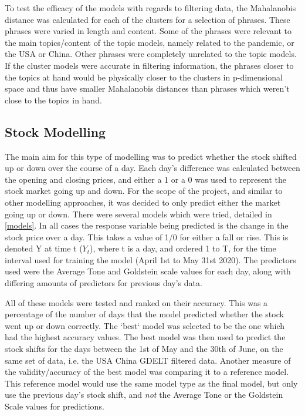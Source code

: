 To test the efficacy of the models with regards to filtering data, the Mahalanobis distance was calculated for each of the clusters for a selection of phrases. These phrases were varied in length and content. Some of the phrases were relevant to the main topics/content of the topic models, namely related to the pandemic, or the USA or China. Other phrases were completely unrelated to the topic models. If the cluster models were accurate in filtering information, the phrases closer to the topics at hand would be physically closer to the clusters in p-dimensional space and thus have smaller Mahalanobis distances than phrases which weren't close to the topics in hand.  

\subsection{Stock Modelling}
The main aim for this type of modelling was to predict whether the stock shifted up or down over the course of a day. Each day's difference was calculated between the opening and closing prices, and either a 1 or a 0 was used to represent the stock market going up and down. For the scope of the project, and similar to other modelling approaches, it was decided to only predict either the market going up or down. There were several models which were tried, detailed in \ref{models}. In all cases the response variable being predicted is the change in the stock price over a day. This takes a value of 1/0 for either a fall or rise. This is denoted Y at time t ($Y_{t}$), where t is a day, and ordered 1 to T, for the time interval used for training the model (April 1st to May 31st 2020). The predictors used were the Average Tone and Goldstein scale values for each day, along with differing amounts of predictors for previous day's data.

All of these models were tested and ranked on their accuracy. This was a percentage of the number of days that the model predicted whether the stock went up or down correctly. The `best` model was selected to be the one which had the highest accuracy values. The best model was then used to predict the stock shifts for the days between the 1st of May and the 30th of June, on the same set of data, i.e. the USA China GDELT filtered data. Another measure of the validity/accuracy of the best model was comparing it to a reference model. This reference model would use the same model type as the final model, but only use the previous day's stock shift, and \textit{not} the Average Tone or the Goldstein Scale values for predictions. 

